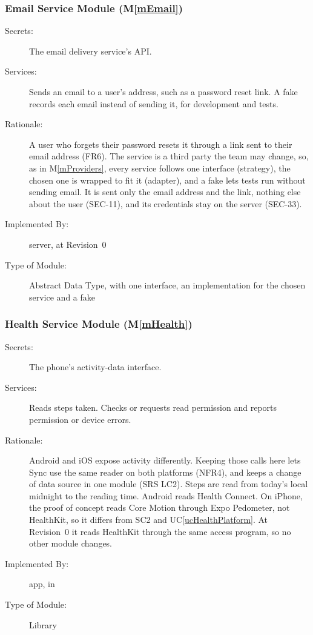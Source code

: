 \documentclass[12pt, titlepage]{article}
\newcommand{\uref}[1]{UC\ref{#1}}
\newcommand{\mref}[1]{M\ref{#1}}
\begin{document}
\subsubsection{Email Service Module (\mref{mEmail})}

\begin{description}
\item[Secrets:] The email delivery service's API.
\item[Services:] Sends an email to a user's address, such as a password reset link. A fake records each email instead of sending it, for development and tests.
\item[Rationale:] A user who forgets their password resets it through a link sent to their email address (FR6). The service is a third party the team may change, so, as in \mref{mProviders}, every service follows one interface (strategy), the chosen one is wrapped to fit it (adapter), and a fake lets tests run without sending email. It is sent only the email address and the link, nothing else about the user (SEC-11), and its credentials stay on the server (SEC-33).
\item[Implemented By:] \progname{} server, at Revision~0
\item[Type of Module:] Abstract Data Type, with one interface, an implementation for the chosen service and a fake
\end{description}

\subsubsection{Health Service Module (\mref{mHealth})}

\begin{description}
\item[Secrets:] The phone's activity-data interface.
\item[Services:] Reads steps taken. Checks or
  requests read permission and reports permission or device errors. 
\item[Rationale:] Android and iOS expose activity differently. Keeping those
  calls here lets Sync use the same reader on both platforms (NFR4), and
  keeps a change of data source in one module (SRS LC2). Steps are read
  from today's local midnight to the reading time. Android reads
  Health Connect. On iPhone, the proof of concept reads Core Motion through
  Expo Pedometer, not HealthKit, so it differs from SC2 and
  \uref{ucHealthPlatform}. At Revision~0 it reads HealthKit through the same
  access program, so no other module changes.
\item[Implemented By:] \progname{} app, in
\item[Type of Module:] Library
\end{description}
\end{document}
